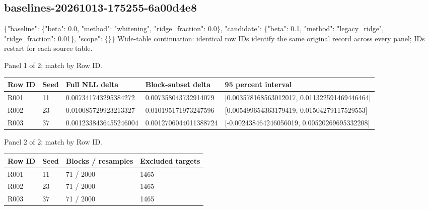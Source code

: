 \documentclass[10pt]{article}
\begin{document}
\subsection{baselines-20261013-175255-6a00d4e8}
\{"baseline": \{"beta": 0.0, "method": "whitening", "ridge\_fraction": 0.0\}, "candidate": \{"beta": 0.1, "method": "legacy\_ridge", "ridge\_fraction": 0.01\}, "scope": \{\}\}
Wide-table continuation: identical row IDs identify the same original record across every panel; IDs restart for each source table.
\par\noindent Panel 1 of 2; match by Row ID.
{\scriptsize\setlength{\tabcolsep}{2pt}
\begin{longtable}{p{}p{}p{}p{}p{}}
Row ID & Seed & Full NLL delta & Block-subset delta & 95 percent interval \\
\hline\endhead
R001 & 11 & 0.007341743295384272 & 0.007358043732914079 & [0.003578168563012017, 0.011322591469446464] \\
R002 & 23 & 0.010085729923213327 & 0.010195171973247596 & [0.005499654363179419, 0.01504279117529553] \\
R003 & 37 & 0.0012338436455246004 & 0.0012706044011388724 & [-0.002438464246056019, 0.00520269695332208] \\
\end{longtable}}
\par\noindent Panel 2 of 2; match by Row ID.
{\scriptsize\setlength{\tabcolsep}{2pt}
\begin{longtable}{p{}p{}p{}p{}}
Row ID & Seed & Blocks / resamples & Excluded targets \\
\hline\endhead
R001 & 11 & 71 / 2000 & 1465 \\
R002 & 23 & 71 / 2000 & 1465 \\
R003 & 37 & 71 / 2000 & 1465 \\
\end{longtable}}
\end{document}
